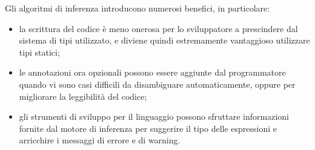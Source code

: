 \noindent Gli algoritmi di inferenza introducono numerosi benefici, in particolare:
\begin{itemize}
      \item la scrittura del codice è meno onerosa per lo sviluppatore a prescindere dal sistema di tipi utilizzato,
            e diviene quindi estremamente vantaggioso utilizzare tipi statici;
      \item le annotazioni ora opzionali possono essere aggiunte dal programmatore quando vi sono casi difficili
            da disambiguare automaticamente, oppure per migliorare la leggibilità del codice;
      \item gli strumenti di sviluppo per il linguaggio possono sfruttare informazioni fornite dal motore di inferenza
            per suggerire il tipo delle espressioni e arricchire i messaggi di errore e di warning.
\end{itemize}